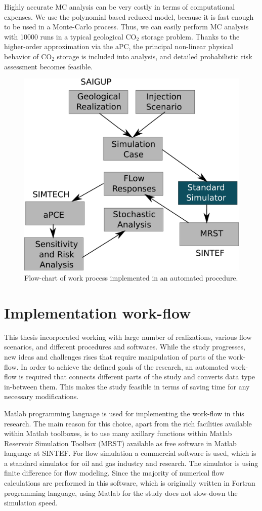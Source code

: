 Highly accurate MC analysis can be very costly in terms of computational
expenses. We use the polynomial based reduced model, because it is fast enough
to be used in a Monte-Carlo process. Thus, we can easily perform MC analysis
with 10000 runs in a typical geological $\mbox{CO}_{2}$ storage problem. Thanks
to the higher-order approximation via the aPC, the principal non-linear physical
behavior of  $\mbox{CO}_{2}$ storage is included into analysis, and detailed
probabilistic risk assessment becomes feasible.

\begin{figure}[thb]
  \centering
  \includegraphics[width=0.65 \linewidth]{./figurer/ENCL} 
  \caption{Flow-chart of work process implemented in an automated procedure.}
  \label{fig:encl}
%
\end{figure}

\section{Implementation work-flow}
\label{sec:ImplementationWorkFlow}

This thesis incorporated working with large number of realizations, various flow
scenarios, and different procedures and softwares. While the study progresses,
new ideas and challenges rises that require manipulation of parts of the
work-flow. In order to achieve the defined goals of the research, an automated
work-flow is required that connects different parts of the study and converts
data type in-between them. This makes the study feasible in terms of saving time
for any necessary modifications.

Matlab programming language is used for implementing the work-flow in this
research. The main reason for this choice, apart from the rich facilities
available within Matlab toolboxes, is to use many axillary functions within
Matlab Reservoir Simulation Toolbox (MRST) available as free software in Matlab
language at SINTEF. For flow simulation a commercial software is used, which is
a standard simulator for oil and gas industry and research. The simulator is
using finite difference for flow modeling. Since the majority of numerical flow
calculations are performed in this software, which is originally written in
Fortran programming language, using Matlab for the study does not slow-down the
simulation speed. 

